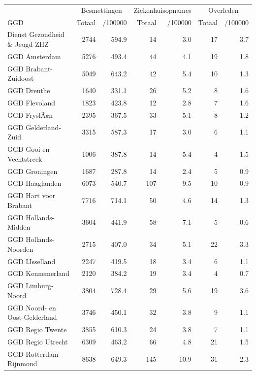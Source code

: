 \documentclass[
  english,
  man,floatsintext]{apa6}
\begin{document}
\begin{table}
\centering\begingroup\fontsize{10}{12}\selectfont

\begin{threeparttable}
\begin{tabular}{lrrrrrr}
\toprule
\multicolumn{1}{c}{ } & \multicolumn{2}{c}{Besmettingen} & \multicolumn{2}{c}{Ziekenhuisopnames} & \multicolumn{2}{c}{Overleden} \\
\cmidrule(l{3pt}r{3pt}){2-3} \cmidrule(l{3pt}r{3pt}){4-5} \cmidrule(l{3pt}r{3pt}){6-7}
GGD & Totaal & /100000 & Totaal & /100000 & Totaal & /100000\\
\midrule
Dienst Gezondheid \& Jeugd ZHZ & 2744 & 594.9 & 14 & 3.0 & 17 & 3.7\\
GGD Amsterdam & 5276 & 493.4 & 44 & 4.1 & 19 & 1.8\\
GGD Brabant-Zuidoost & 5049 & 643.2 & 42 & 5.4 & 10 & 1.3\\
GGD Drenthe & 1640 & 331.1 & 26 & 5.2 & 8 & 1.6\\
GGD Flevoland & 1823 & 423.8 & 12 & 2.8 & 7 & 1.6\\
GGD FryslÃ¢n & 2395 & 367.5 & 33 & 5.1 & 8 & 1.2\\
GGD Gelderland-Zuid & 3315 & 587.3 & 17 & 3.0 & 6 & 1.1\\
GGD Gooi en Vechtstreek & 1006 & 387.8 & 14 & 5.4 & 4 & 1.5\\
GGD Groningen & 1687 & 287.8 & 14 & 2.4 & 5 & 0.9\\
GGD Haaglanden & 6073 & 540.7 & 107 & 9.5 & 10 & 0.9\\
GGD Hart voor Brabant & 7716 & 714.1 & 50 & 4.6 & 14 & 1.3\\
GGD Hollands-Midden & 3604 & 441.9 & 58 & 7.1 & 5 & 0.6\\
GGD Hollands-Noorden & 2715 & 407.0 & 34 & 5.1 & 22 & 3.3\\
GGD IJsselland & 2247 & 419.5 & 18 & 3.4 & 6 & 1.1\\
GGD Kennemerland & 2120 & 384.2 & 19 & 3.4 & 4 & 0.7\\
GGD Limburg-Noord & 3804 & 728.4 & 29 & 5.6 & 19 & 3.6\\
GGD Noord- en Oost-Gelderland & 3746 & 450.1 & 32 & 3.8 & 9 & 1.1\\
GGD Regio Twente & 3855 & 610.3 & 24 & 3.8 & 7 & 1.1\\
GGD Regio Utrecht & 6309 & 463.2 & 66 & 4.8 & 21 & 1.5\\
GGD Rotterdam-Rijnmond & 8638 & 649.3 & 145 & 10.9 & 31 & 2.3\\

\end{tabular}
\end{threeparttable}
\end{table}
\end{document}
